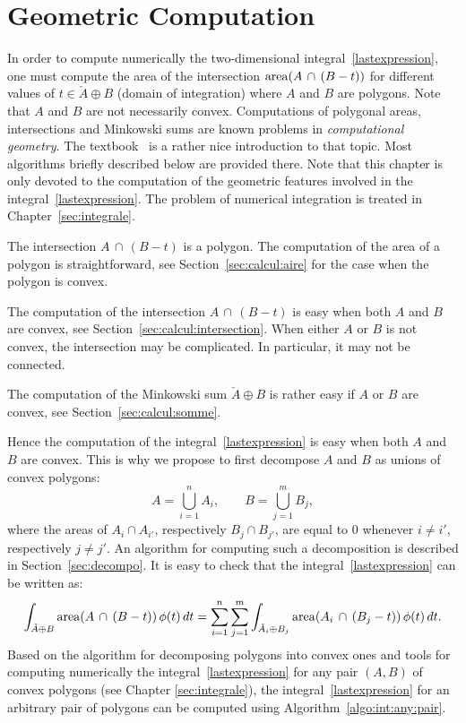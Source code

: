
 

\chapter{Geometric Computation}
\label{sec:geom:algo}

In order to compute numerically the two-dimensional
integral~\eqref{lastexpression}, one must compute the area of the
intersection $\mathrm{area}(A\,\cap\,(B-t))$ for different values of
$t\in\check{A}\oplus B$ (domain of integration) where $A$ and $B$ are
polygons. Note that $A$ and $B$ are not necessarily convex.
Computations of polygonal areas, intersections and Minkowski sums are
known problems in \emph{computational geometry}. The
textbook~\cite{ORourke:1998} is a rather nice introduction to that
topic. Most algorithms briefly described below are provided
there. Note that this chapter is only devoted to the computation of
the geometric features involved in the
integral~\eqref{lastexpression}. The problem of numerical integration
is treated in Chapter~\ref{sec:integrale}.

The intersection $A\,\cap\,(B-t)$ is a polygon. The computation of the
area of a polygon is straightforward, see
Section~\ref{sec:calcul:aire} for the case when the polygon is convex.

The computation of the intersection $A\,\cap\,(B-t)$ is easy when both
$A$ and $B$ are convex, see Section~\ref{sec:calcul:intersection}.
When either $A$ or $B$ is not convex, the intersection may be
complicated. In particular, it may not be connected.

The computation of the Minkowski sum $\check{A}\oplus B$ is rather
easy if $A$ or $B$ are convex, see Section~\ref{sec:calcul:somme}.

Hence the computation of the integral~\eqref{lastexpression} is easy
when both $A$ and $B$ are convex. This is why we propose to first
decompose $A$ and $B$ as unions of convex polygons:
\begin{equation}
  \label{eq:convex:decomp:A:B}
  A = \bigcup_{i=1}^n A_i,\qquad B = \bigcup_{j=1}^m B_j,
\end{equation}
where the areas of $A_{i}\cap A_{i'}$, respectively $B_{j}\cap
B_{j'}$, are equal to $0$ whenever $i\neq i'$, respectively $j\neq
j'$. An algorithm for computing such a decomposition is
described in Section~\ref{sec:decompo}. It is easy to check that the
integral~\eqref{lastexpression} can be written as:
\begin{equation}
  \label{eq:integral:decomposition}
  \int_{\check{A}\oplus B} \mathrm{area}(A\,\cap\,(B-t)) \,\phi(t)
  \,dt =
  \sum_{i=1}^n \sum_{j=1}^m
  \int_{\check{A}_i\oplus B_j} \mathrm{area}(A_i\,\cap\,(B_j-t)) \,\phi(t)
  \,dt.
\end{equation}
Based on the algorithm for decomposing polygons into convex ones and
tools for computing numerically the integral~\eqref{lastexpression}
for any pair $(A,B)$ of convex polygons (see Chapter
\ref{sec:integrale}), the integral~\eqref{lastexpression} for an
arbitrary pair of polygons can be computed using
Algorithm~\ref{algo:int:any:pair}.

